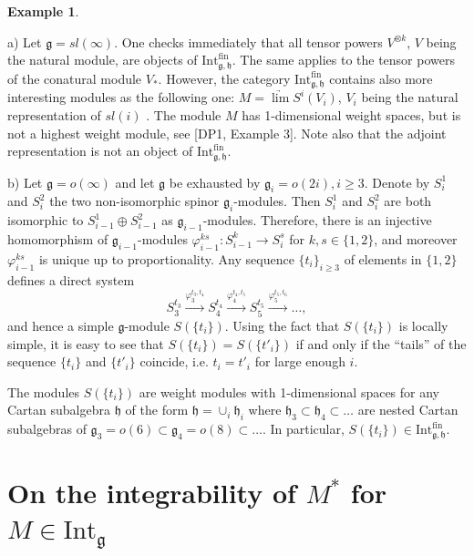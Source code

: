\documentclass{birkmult}
\newcounter{theorem}
\newtheorem{example}[theo]{Example}
\newcommand{\hh}{\mathfrak{h}}
\renewcommand{\gg}{\mathfrak{g}}
\renewcommand {\phi} {\varphi}
\newcommand{\ds}{\displaystyle}
\newcommand{\Int}{\mathrm{Int}}
\newcommand{\Intfin}{\Int^{\mathrm{fin}}_{\gg,\hh}}
\begin{document}
\begin{example}\label{ex38}\end{example}

a) Let $\gg=sl(\infty)$. One checks immediately that all tensor
powers $V^{\otimes k}$, $V$ being the natural module, are objects
of $\Intfin$. The same applies to the tensor powers of the
conatural module $V_*$. However, the category $\Intfin$ contains
also more interesting modules as the following one:
$M=\underrightarrow{\lim} S^i(V_i)$, $V_i$ being the natural
representation of $sl(i)$ . The module $M$ has 1-dimensional
weight spaces, but is not a highest weight module, see [DP1,
Example 3]. Note also that the adjoint representation is not an
object of $\Intfin$.

b) Let $\gg=o(\infty)$ and let $\gg$ be exhausted by
$\gg_i=o(2i),i\geq 3$. Denote by $S_i^1$ and $S_i^2$ the two
non-isomorphic spinor $\gg_i$-modules. Then $S_i^1$ and $S_i^2$
are both isomorphic to $S_{i-1}^1\oplus S_{i-1}^2$ as
$\gg_{i-1}$-modules. Therefore, there is an injective homomorphism
of $\gg_{i-1}$-modules $\phi^{ks}_{i-1}: S^k_{i-1}\to S^s_i$ for
$k,s\in\{1,2\}$, and moreover $\phi^{ks}_{i-1}$ is unique up to
proportionality. Any sequence $\{t_i\}_{i\geq 3}$ of elements in
$\{1,2\}$ defines a direct system
$$S_3^{t_3}\stackrel{\phi_3^{t_3,t_4}}{\longrightarrow}S_4^{t_4}\stackrel{\phi_4^{t_4,t_5}}{\longrightarrow} S_5^{t_5}\stackrel{\phi_5^{t_5,t_6}}{\longrightarrow}\dots,$$
and hence a simple $\gg$-module $S(\{t_i\})$. Using the fact that
$S(\{t_i\})$ is locally simple, it is easy to see that
$S(\{t_i\})=S(\{t'_i\})$ if and only if the  ``tails'' of the
sequence $\{t_i\}$ and $\{t'_i\}$ coincide, i.e. $t_i=t'_i$ for
large enough $i$.

The modules $S(\{t_i\})$ are weight modules with 1-dimensional
spaces for any Cartan subalgebra $\hh$ of the form
$\ds\hh=\cup_i\hh_i$ where $\hh_3\subset\hh_4\subset\dots$ are
nested Cartan subalgebras of
$\gg_3=o(6)\subset\gg_4=o(8)\subset\dots$. In particular, $S(\{t_i\})\in\Intfin$.

\section{On the integrability of $M^*$ for $M\in\Int_{\gg}$}
\end{document}
